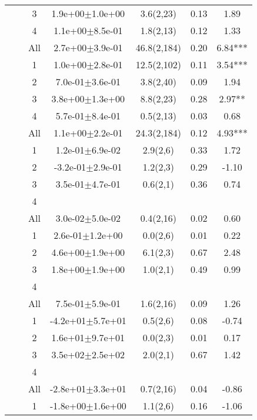 \begin{longtable}{llccccS[table-format=-2.2, table-space-text-post = {***}]}
   &  & 3 &  1.9e+00$\pm$1.0e+00 & 3.6(2,23) & 0.13 & 1.89 \\ 
   &  & 4 &  1.1e+00$\pm$8.5e-01 & 1.8(2,13) & 0.12 & 1.33 \\ 
   &  & All &  2.7e+00$\pm$3.9e-01 & 46.8(2,184) & 0.20 & 6.84*** \\ 
   \midrule
{} & {} & 1 &  1.0e+00$\pm$2.8e-01 & 12.5(2,102) & 0.11 & 3.54*** \\ 
   &  & 2 &  7.0e-01$\pm$3.6e-01 & 3.8(2,40) & 0.09 & 1.94 \\ 
   &  & 3 &  3.8e+00$\pm$1.3e+00 & 8.8(2,23) & 0.28 & 2.97** \\ 
   &  & 4 &  5.7e-01$\pm$8.4e-01 & 0.5(2,13) & 0.03 & 0.68 \\ 
   &  & All &  1.1e+00$\pm$2.2e-01 & 24.3(2,184) & 0.12 & 4.93*** \\ 
   \midrule
{} & {} & 1 &  1.2e-01$\pm$6.9e-02 & 2.9(2,6) & 0.33 & 1.72 \\ 
   &  & 2 & -3.2e-01$\pm$2.9e-01 & 1.2(2,3) & 0.29 & -1.10 \\ 
   &  & 3 &  3.5e-01$\pm$4.7e-01 & 0.6(2,1) & 0.36 & 0.74 \\ 
   &  & 4 &  &  &  &  \\ 
   &  & All &  3.0e-02$\pm$5.0e-02 & 0.4(2,16) & 0.02 & 0.60 \\ 
   \midrule
{} & {} & 1 &  2.6e-01$\pm$1.2e+00 & 0.0(2,6) & 0.01 & 0.22 \\ 
   &  & 2 &  4.6e+00$\pm$1.9e+00 & 6.1(2,3) & 0.67 & 2.48 \\ 
   &  & 3 &  1.8e+00$\pm$1.9e+00 & 1.0(2,1) & 0.49 & 0.99 \\ 
   &  & 4 &  &  &  &  \\ 
   &  & All &  7.5e-01$\pm$5.9e-01 & 1.6(2,16) & 0.09 & 1.26 \\ 
   \midrule
{} & {} & 1 & -4.2e+01$\pm$5.7e+01 & 0.5(2,6) & 0.08 & -0.74 \\ 
   &  & 2 &  1.6e+01$\pm$9.7e+01 & 0.0(2,3) & 0.01 & 0.17 \\ 
   &  & 3 &  3.5e+02$\pm$2.5e+02 & 2.0(2,1) & 0.67 & 1.42 \\ 
   &  & 4 &  &  &  &  \\ 
   &  & All & -2.8e+01$\pm$3.3e+01 & 0.7(2,16) & 0.04 & -0.86 \\ 
   \midrule
{} & {} & 1 & -1.8e+00$\pm$1.6e+00 & 1.1(2,6) & 0.16 & -1.06 \\ 

\end{longtable}
